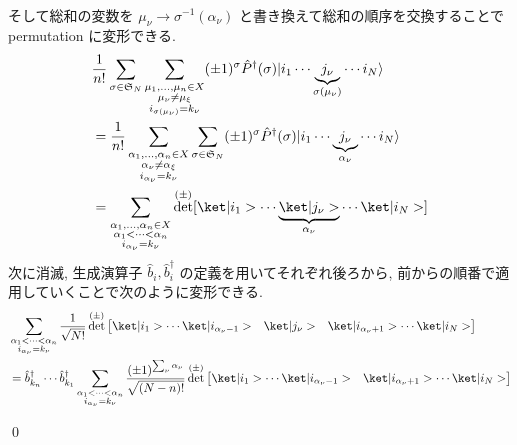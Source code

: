\documentclass[uplatex,dvipdfmx,a4paper,11pt]{jlreq}
\makeatletter
\DeclareMathOperator{\Det}{det}
\renewcommand{\SS}{\mathfrak{S}}
\numberwithin{equation}{section}
\theoremstyle{definition}
\renewenvironment{proof}[1][\proofname]{\par
  \normalfont
  \topsep6\p@\@plus6\p@ \trivlist
  \item[\hskip\labelsep{\bfseries #1}\@addpunct{\bfseries}]\ignorespaces\quad\par
}{
  \qed\endtrivlist\@endpefalse
}
\renewcommand\proofname{証明}
\makeatother
\begin{document}
\begin{proof}
\begin{align}
  \end{align}
  そして総和の変数を $\mu_\nu \to \sigma^{-1}(\alpha_\nu)$ と書き換えて総和の順序を交換することで permutation に変形できる.
  \begin{align}
     & \frac{1}{n!}\sum_{\sigma\in\SS_N}\sum_{\substack{\mu_1,\ldots,\mu_n\in X \\ \mu_\nu\neq\mu_\xi \\ i_{\sigma(\mu_\nu)} = k_\nu}}(\pm 1)^\sigma\hat{P}^\dagger(\sigma)|i_1\cdots\underbrace{j_\nu}_{\sigma(\mu_\nu)}\cdots i_N\rangle \\
     & = \frac{1}{n!}\sum_{\substack{\alpha_1,\ldots,\alpha_n\in X              \\ \alpha_\nu\neq\alpha_\xi \\ i_{\alpha_\nu} = k_\nu}}\sum_{\sigma\in\SS_N}(\pm 1)^\sigma\hat{P}^\dagger(\sigma)|i_1\cdots\underbrace{j_\nu}_{\alpha_\nu}\cdots i_N\rangle \\
     & = \sum_{\substack{\alpha_1,\ldots,\alpha_n\in X                          \\ \alpha_1 < \cdots < \alpha_n \\ i_{\alpha_\nu} = k_\nu}}\Det^{(\pm)}[\ket|i_1>\cdots\underbrace{\ket|j_\nu>}_{\alpha_\nu}\cdots\ket|i_N>]
  \end{align}
  次に消滅, 生成演算子 $\hat{b}_i, \hat{b}_i^\dagger$ の定義を用いてそれぞれ後ろから, 前からの順番で適用していくことで次のように変形できる.
  \begin{align}
     & \sum_{\substack{\alpha_1 < \cdots < \alpha_n                                                                                                                                                                                                      \\ i_{\alpha_\nu} = k_\nu}}\frac{1}{\sqrt{N!}}\Det^{(\pm)}\begin{bmatrix}\ket|i_1>\cdots\ket|i_{\alpha_\nu-1}> & \ket|j_\nu> & \ket|i_{\alpha_\nu+1}>\cdots\ket|i_N>\end{bmatrix} \\
     & = \hat{b}_{k_n}^\dagger\cdots\hat{b}_{k_1}^\dagger\sum_{\substack{\alpha_1 < \cdots < \alpha_n                                                                                                                                                    \\ i_{\alpha_\nu} = k_\nu}}\frac{(\pm 1)^{\sum_{\nu}\alpha_\nu}}{\sqrt{(N - n)!}}\Det^{(\pm)}\begin{bmatrix}\ket|i_1>\cdots\ket|i_{\alpha_\nu-1}> & \ket|i_{\alpha_\nu+1}>\cdots\ket|i_N>\end{bmatrix}                        \\

\end{align}
\end{proof}
\end{document}
